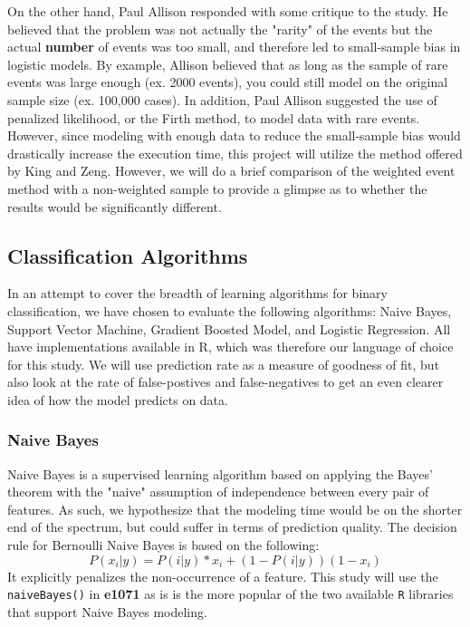 \documentclass[twoside]{article}
\begin{document}
\begin{multicols}{2}
On the other hand, Paul Allison responded with some critique to the study\cite{2}. He believed that the problem was not actually the "rarity" of the events but the actual \textbf{number} of events was too small, and therefore led to small-sample bias in logistic models. By example, Allison believed that as long as the sample of rare events was large enough (ex. 2000 events), you could still model on the original sample size (ex. 100,000 cases). In addition, Paul Allison suggested the use of penalized likelihood, or the Firth method, to model data with rare events\cite{2}. However, since modeling with enough data to reduce the small-sample bias would drastically increase the execution time, this project will utilize the method offered by King and Zeng. However, we will do a brief comparison of the weighted event method with a non-weighted sample to provide a glimpse as to whether the results would be significantly different.

\subsection{Classification Algorithms}
In an attempt to cover the breadth of learning algorithms for binary classification, we have chosen to evaluate the following algorithms: Naive Bayes, Support Vector Machine, Gradient Boosted Model, and Logistic Regression. All have implementations available in R, which was therefore our language of choice for this study. We will use prediction rate as a measure of goodness of fit, but also look at the rate of false-postives and false-negatives to get an even clearer idea of how the model predicts on data.

\subsubsection{Naive Bayes}
Naive Bayes is a supervised learning algorithm based on applying the Bayes' theorem with the "naive" assumption of independence between every pair of features. As such, we hypothesize that the modeling time would be on the shorter end of the spectrum, but could suffer in terms of prediction quality. The decision rule for Bernoulli Naive Bayes is based on the following\cite{15}:
\[ P(x_i | y) = P(i | y)*x_i + (1 - P(i | y))(1 - x_i) \]
It explicitly penalizes the non-occurrence of a feature\cite{15}. This study will use the \texttt{naiveBayes()} in \textbf{e1071} as is is the more popular of the two available \texttt{R} libraries that support Naive Bayes modeling\cite{22}.


\end{multicols}
\end{document}

